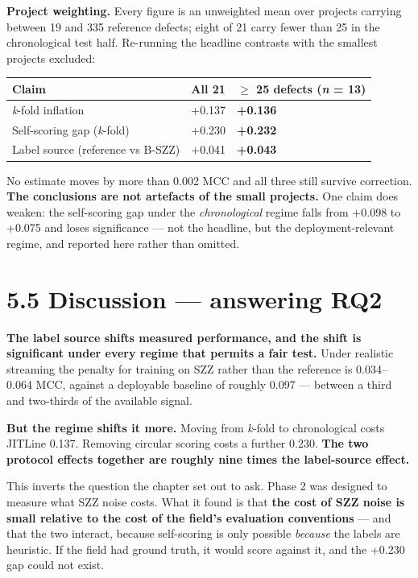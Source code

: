 \textbf{Project weighting.} Every figure is an unweighted mean over
projects carrying between 19 and 335 reference defects; eight of 21
carry fewer than 25 in the chronological test half. Re-running the
headline contrasts with the smallest projects excluded:

\begin{longtable}[]{@{}lll@{}}
\toprule\noalign{}
Claim & All 21 & \ensuremath{\geq} 25 defects (\emph{n} = 13) \\
\midrule\noalign{}
\endhead
\bottomrule\noalign{}
\endlastfoot
\emph{k}-fold inflation & +0.137 & \textbf{+0.136} \\
Self-scoring gap (\emph{k}-fold) & +0.230 & \textbf{+0.232} \\
Label source (reference vs B-SZZ) & +0.041 & \textbf{+0.043} \\
\end{longtable}

No estimate moves by more than 0.002 MCC and all three still survive
correction. \textbf{The conclusions are not artefacts of the small
projects.} One claim does weaken: the self-scoring gap under the
\emph{chronological} regime falls from +0.098 to +0.075 and loses
significance --- not the headline, but the deployment-relevant regime,
and reported here rather than omitted.

\section{5.5 Discussion --- answering
RQ2}\label{discussion-answering-rq2}

\textbf{The label source shifts measured performance, and the shift is
significant under every regime that permits a fair test.} Under
realistic streaming the penalty for training on SZZ rather than the
reference is 0.034--0.064 MCC, against a deployable baseline of roughly
0.097 --- between a third and two-thirds of the available signal.

\textbf{But the regime shifts it more.} Moving from \emph{k}-fold to
chronological costs JITLine 0.137. Removing circular scoring costs a
further 0.230. \textbf{The two protocol effects together are roughly
nine times the label-source effect.}

This inverts the question the chapter set out to ask. Phase 2 was
designed to measure what SZZ noise costs. What it found is that
\textbf{the cost of SZZ noise is small relative to the cost of the
field's evaluation conventions} --- and that the two interact, because
self-scoring is only possible \emph{because} the labels are heuristic.
If the field had ground truth, it would score against it, and the +0.230
gap could not exist.

